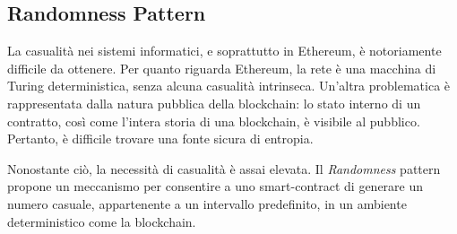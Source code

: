 {{\begin{table}[H]
		\caption{Specifiche del Full Payment (Pull Over Push) Pattern}
	\end{table}
}
\newpage
{\subsection{Randomness Pattern}
	La casualità nei sistemi informatici, e soprattutto in Ethereum, è notoriamente difficile da ottenere. Per quanto riguarda Ethereum, la rete è una macchina di Turing deterministica, senza alcuna casualità intrinseca. Un'altra problematica è rappresentata dalla natura pubblica della blockchain: lo stato interno di un contratto, così come l'intera storia di una blockchain, è visibile al pubblico. Pertanto, è difficile trovare una fonte sicura di entropia.\par
	Nonostante ciò, la necessità di casualità è assai elevata. Il \textit{Randomness} pattern propone un meccanismo per consentire a uno smart-contract di generare un numero casuale, appartenente a un intervallo predefinito, in un ambiente deterministico come la blockchain.
	\begin{table}[H]
		\centering
\end{table}}}
